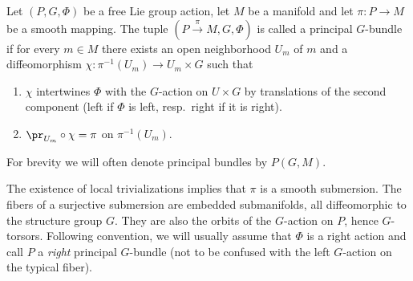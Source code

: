 \begin{defn}\label{def pfb 2}
    Let $(P,G,\Phi)$ be a free Lie group action, let $M$ be a manifold and let $\pi:P\to M$ be a smooth mapping. The tuple $(P\overset{\pi}{\to}M,G,\Phi)$ is called a principal $G$-bundle if for every $m\in M$ there exists an open neighborhood $U_m$ of $m$ and a diffeomorphism $\chi:\pi^{-1}(U_m)\to U_m\times G$ such that
    \begin{enumerate}
        \item $\chi$ intertwines $\Phi$ with the $G$-action on $U\times G$ by translations of the second component (left if $\Phi$ is left, resp.\ right if it is right).
        \item $\pr_{U_m}\circ \chi=\pi$ on $\pi^{-1}(U_m)$.
    \end{enumerate}
    For brevity we will often denote principal bundles by $P(G,M)$.
\end{defn}

The existence of local trivializations implies that $\pi$ is a smooth submersion. The fibers of a surjective submersion are embedded submanifolds, all diffeomorphic to the structure group $G$. They are also the orbits of the $G$-action on $P$, hence $G$-torsors. Following convention, we will usually assume that $\Phi$ is a right action and call $P$ a \emph{right} principal $G$-bundle (not to be confused with the left $G$-action on the typical fiber).

